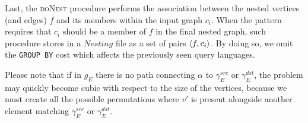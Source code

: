 Last, the \textsc{doNest} procedure performs the association between the nested vertices (and edges) $f$ and its members within the input graph $c_i$. When the pattern requires that $c_i$ should be a member of $f$ in the final nested graph, such procedure stores in a $Nesting$ file as a set of pairs $\Braket{f,c_i}$. By doing so, we omit the \texttt{GROUP BY} cost which affects the previously seen query languages. 



Please note that if in $g_E$ there is no path connecting $\alpha$ to $\gamma_E^{src}$ or $\gamma_E^{dst}$, the problem may quickly become cubic with respect to the size of the vertices, because we must create all the possible permutations where $v'$ is present alongside another element matching $\gamma_E^{src}$ or $\gamma_E^{dst}$.
